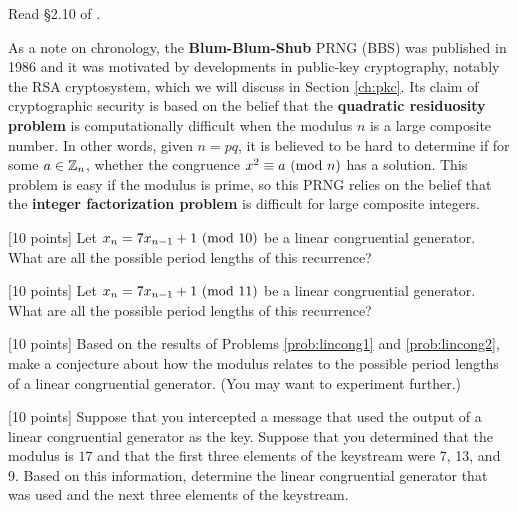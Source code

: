 Read \S 2.10 of \cite{tw}.


As a note on chronology, the {\bf Blum-Blum-Shub} PRNG  (BBS) was published in 1986 and it was motivated by developments in public-key cryptography, notably the RSA  cryptosystem, which we will discuss in Section \ref{ch:pkc}. Its claim of cryptographic security is based on the belief that the {\bf quadratic residuosity problem} is computationally difficult when the modulus $n$ is a large composite number. In other words, given $n=pq$, it is believed to be hard to determine if for some $a\in\mathbb{Z}_n$, whether the congruence $x^2 \equiv a \mbox{\ $\left(\mathrm{mod}\ {n}\right)$}$ has a solution. This problem is easy if the modulus is prime, so this PRNG relies on the belief that the {\bf integer factorization problem} is difficult for large composite integers.


\begin{problem}
\label{prob:lincong1}  [10 points]
Let $x_n = 7 x_{n-1} + 1 \mbox{\ $\left(\mathrm{mod}\ {10}\right)$}$ be a linear congruential generator.  What are all the possible period lengths of this recurrence?
\end{problem}

\begin{problem}
\label{prob:lincong2}  [10 points]
Let $x_n = 7 x_{n-1} + 1 \mbox{\ $\left(\mathrm{mod}\ {11}\right)$}$ be a linear congruential generator.  What are all the possible period lengths of this recurrence?
\end{problem}

\begin{problem}
\label{prob:lincong3}  [10 points]
Based on the results of Problems \ref{prob:lincong1} and \ref{prob:lincong2}, make a conjecture about how the modulus relates to the possible period lengths of a linear congruential generator. (You may want to experiment further.)
\end{problem}

\begin{problem}
\label{prob:lincong4}  [10 points]
Suppose that you intercepted a message that used the output of a linear congruential generator  as the key. Suppose that you determined that the modulus is $17$ and that the first three elements of the keystream were 7, 13, and 9. Based on this information, determine the linear congruential generator that was used and the next three elements of the keystream.
\end{problem}

